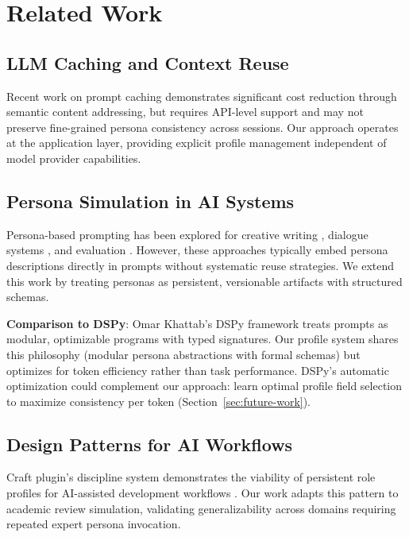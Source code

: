 \section{Related Work}

\subsection{LLM Caching and Context Reuse}

Recent work on prompt caching \cite{anthropic2024caching} demonstrates significant cost reduction through semantic content addressing, but requires API-level support and may not preserve fine-grained persona consistency across sessions. Our approach operates at the application layer, providing explicit profile management independent of model provider capabilities.

\subsection{Persona Simulation in AI Systems}

Persona-based prompting has been explored for creative writing \cite{dang2023personas}, dialogue systems \cite{zhang2018personas}, and evaluation \cite{park2023generative}. However, these approaches typically embed persona descriptions directly in prompts without systematic reuse strategies. We extend this work by treating personas as persistent, versionable artifacts with structured schemas.

\textbf{Comparison to DSPy}: Omar Khattab's DSPy framework \cite{khattab2023dspy} treats prompts as modular, optimizable programs with typed signatures. Our profile system shares this philosophy (modular persona abstractions with formal schemas) but optimizes for token efficiency rather than task performance. DSPy's automatic optimization could complement our approach: learn optimal profile field selection to maximize consistency per token (Section~\ref{sec:future-work}).

\subsection{Design Patterns for AI Workflows}

Craft plugin's discipline system demonstrates the viability of persistent role profiles for AI-assisted development workflows \cite{internal2025craft}. Our work adapts this pattern to academic review simulation, validating generalizability across domains requiring repeated expert persona invocation.
